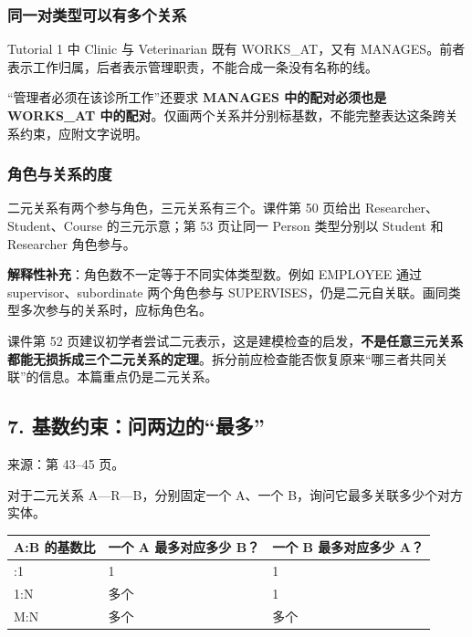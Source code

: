 \subsubsection{同一对类型可以有多个关系}\label{02_er_modelling_zh-ux540cux4e00ux5bf9ux7c7bux578bux53efux4ee5ux6709ux591aux4e2aux5173ux7cfb}

Tutorial 1 中 Clinic 与 Veterinarian 既有 WORKS\_AT，又有 MANAGES。前者表示工作归属，后者表示管理职责，不能合成一条没有名称的线。

``管理者必须在该诊所工作''还要求 \textbf{MANAGES 中的配对必须也是 WORKS\_AT 中的配对}。仅画两个关系并分别标基数，不能完整表达这条跨关系约束，应附文字说明。

\subsubsection{角色与关系的度}\label{02_er_modelling_zh-ux89d2ux8272ux4e0eux5173ux7cfbux7684ux5ea6}

二元关系有两个参与角色，三元关系有三个。课件第 50 页给出 Researcher、Student、Course 的三元示意；第 53 页让同一 Person 类型分别以 Student 和 Researcher 角色参与。

\textbf{解释性补充}：角色数不一定等于不同实体类型数。例如 EMPLOYEE 通过 supervisor、subordinate 两个角色参与 SUPERVISES，仍是二元自关联。画同类型多次参与的关系时，应标角色名。

课件第 52 页建议初学者尝试二元表示，这是建模检查的启发，\textbf{不是任意三元关系都能无损拆成三个二元关系的定理}。拆分前应检查能否恢复原来``哪三者共同关联''的信息。本篇重点仍是二元关系。

\subsection{7. 基数约束：问两边的``最多''}\label{02_er_modelling_zh-ux57faux6570ux7ea6ux675fux95eeux4e24ux8fb9ux7684ux6700ux591a}

来源：第 43--45 页。

对于二元关系 A---R---B，分别固定一个 A、一个 B，询问它最多关联多少个对方实体。

\begin{longtable}[]{@{}lll@{}}
\toprule\noalign{}
A:B 的基数比 & 一个 A 最多对应多少 B？ & 一个 B 最多对应多少 A？ \\
\midrule\noalign{}
\endhead
\bottomrule\noalign{}
\endlastfoot
1:1 & 1 & 1 \\
1:N & 多个 & 1 \\
M:N & 多个 & 多个 \\
\end{longtable}

